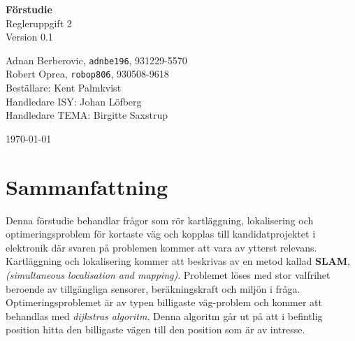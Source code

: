 \documentclass[12pt]{article}
\date{} %
\begin{document}
	\begin{titlepage}
		\begin{center}
			
			{\Large\bfseries Förstudie} \\ %
			\vspace{0.5\baselineskip}
			Regleruppgift 2\\
			\vspace{0.5\baselineskip}
			Version 0.1
			
			\vspace{2\baselineskip}
			
			Adnan Berberovic, \texttt{adnbe196}, 931229-5570 \\
		    Robert Oprea, \texttt{robop806}, 930508-9618 \\ %
		    
		    \vspace{4\baselineskip}
		    Beställare: Kent Palmkvist\\
		    Handledare ISY: Johan Löfberg\\
		    Handledare TEMA: Birgitte Saxstrup\\
			
			\vspace{3\baselineskip}
			
			\today	%
			
		\end{center}
	\end{titlepage}
	
	\setcounter{secnumdepth}{0} %
	\section*{Sammanfattning}
	Denna förstudie behandlar frågor som rör kartläggning, lokalisering och optimeringsproblem för kortaste väg och kopplas till kandidatprojektet i elektronik där svaren på problemen kommer att vara av ytterst relevans.\\[0.1in]
	Kartläggning och lokalisering kommer att beskrivas av en metod kallad \textbf{SLAM}, \textit{(simultaneous localisation and mapping)}. Problemet löses med stor valfrihet beroende av tillgängliga sensorer, beräkningskraft och miljön i fråga.\\[0.1in]
	Optimeringsproblemet är av typen billigaste väg-problem och kommer att behandlas med \textit{dijkstras algoritm}. Denna algoritm går ut på att i befintlig position hitta den billigaste vägen till den position som är av intresse.
	
\end{document}
